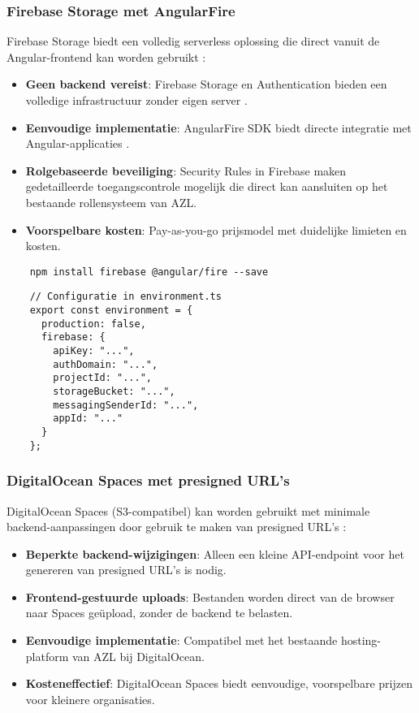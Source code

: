 \subsubsection{Firebase Storage met AngularFire}
Firebase Storage biedt een volledig serverless oplossing die direct vanuit de Angular-frontend kan worden gebruikt \autocite{firebase_storage}:

\begin{itemize}
  \item \textbf{Geen backend vereist}: Firebase Storage en Authentication bieden een volledige infrastructuur zonder eigen server \autocite{firebase_auth}.
  \item \textbf{Eenvoudige implementatie}: AngularFire SDK biedt directe integratie met Angular-applicaties \autocite{angular_fire}.
  \item \textbf{Rolgebaseerde beveiliging}: Security Rules in Firebase maken gedetailleerde toegangscontrole mogelijk die direct kan aansluiten op het bestaande rollensysteem van AZL.
  \item \textbf{Voorspelbare kosten}: Pay-as-you-go prijsmodel met duidelijke limieten en kosten.
\end{itemize}

\begin{listing}
  \begin{verbatim}
    npm install firebase @angular/fire --save
  \end{verbatim}
\end{listing}

\begin{listing}
  \begin{verbatim}
    // Configuratie in environment.ts
    export const environment = {
      production: false,
      firebase: {
        apiKey: "...",
        authDomain: "...",
        projectId: "...",
        storageBucket: "...",
        messagingSenderId: "...",
        appId: "..."
      }
    };
  \end{verbatim}
\end{listing}

\subsubsection{DigitalOcean Spaces met presigned URL's}
DigitalOcean Spaces (S3-compatibel) kan worden gebruikt met minimale backend-aanpassingen door gebruik te maken van presigned URL's \autocite{spaces_api}:

\begin{itemize}
  \item \textbf{Beperkte backend-wijzigingen}: Alleen een kleine API-endpoint voor het genereren van presigned URL's is nodig.
  \item \textbf{Frontend-gestuurde uploads}: Bestanden worden direct van de browser naar Spaces geüpload, zonder de backend te belasten.
  \item \textbf{Eenvoudige implementatie}: Compatibel met het bestaande hosting-platform van AZL bij DigitalOcean.
  \item \textbf{Kosteneffectief}: DigitalOcean Spaces biedt eenvoudige, voorspelbare prijzen voor kleinere organisaties.
\end{itemize}

